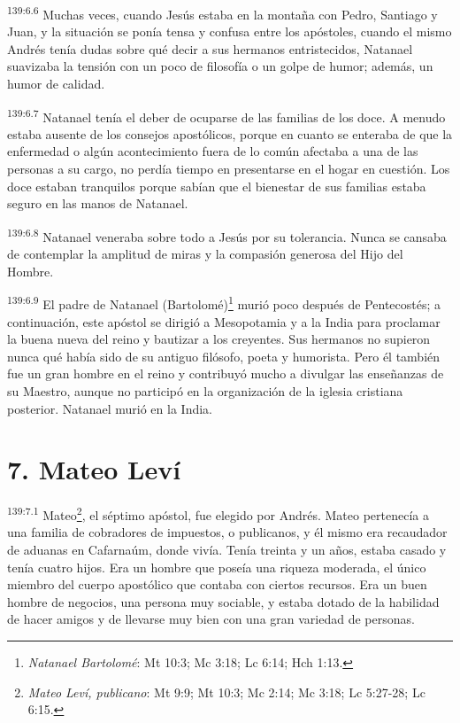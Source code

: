 \par
\textsuperscript{139:6.6} Muchas veces, cuando Jesús estaba en la montaña con Pedro, Santiago y Juan, y la situación se ponía tensa y confusa entre los apóstoles, cuando el mismo Andrés tenía dudas sobre qué decir a sus hermanos entristecidos, Natanael suavizaba la tensión con un poco de filosofía o un golpe de humor; además, un humor de calidad.

\par
\textsuperscript{139:6.7} Natanael tenía el deber de ocuparse de las familias de los doce. A menudo estaba ausente de los consejos apostólicos, porque en cuanto se enteraba de que la enfermedad o algún acontecimiento fuera de lo común afectaba a una de las personas a su cargo, no perdía tiempo en presentarse en el hogar en cuestión. Los doce estaban tranquilos porque sabían que el bienestar de sus familias estaba seguro en las manos de Natanael.

\par
\textsuperscript{139:6.8} Natanael veneraba sobre todo a Jesús por su tolerancia. Nunca se cansaba de contemplar la amplitud de miras y la compasión generosa del Hijo del Hombre.

\par
\textsuperscript{139:6.9} El padre de Natanael (Bartolomé)\footnote{\textit{Natanael Bartolomé}: Mt 10:3; Mc 3:18; Lc 6:14; Hch 1:13.} murió poco después de Pentecostés; a continuación, este apóstol se dirigió a Mesopotamia y a la India para proclamar la buena nueva del reino y bautizar a los creyentes. Sus hermanos no supieron nunca qué había sido de su antiguo filósofo, poeta y humorista. Pero él también fue un gran hombre en el reino y contribuyó mucho a divulgar las enseñanzas de su Maestro, aunque no participó en la organización de la iglesia cristiana posterior. Natanael murió en la India.

\section*{7. Mateo Leví}
\par
\textsuperscript{139:7.1} Mateo\footnote{\textit{Mateo Leví, publicano}: Mt 9:9; Mt 10:3; Mc 2:14; Mc 3:18; Lc 5:27-28; Lc 6:15.}, el séptimo apóstol, fue elegido por Andrés. Mateo pertenecía a una familia de cobradores de impuestos, o publicanos, y él mismo era recaudador de aduanas en Cafarnaúm, donde vivía. Tenía treinta y un años, estaba casado y tenía cuatro hijos. Era un hombre que poseía una riqueza moderada, el único miembro del cuerpo apostólico que contaba con ciertos recursos. Era un buen hombre de negocios, una persona muy sociable, y estaba dotado de la habilidad de hacer amigos y de llevarse muy bien con una gran variedad de personas.

